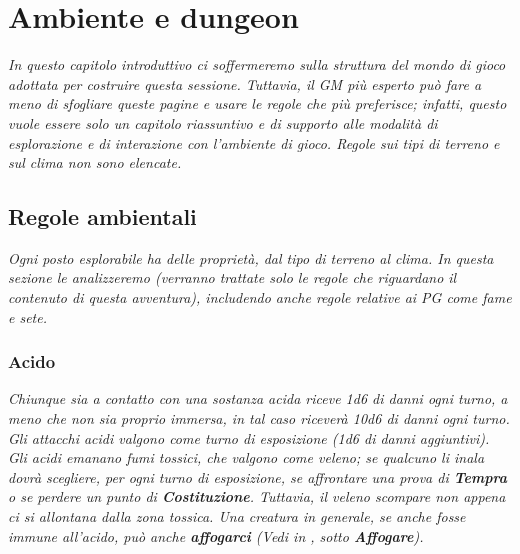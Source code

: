 \chapter{Ambiente e dungeon}
	\emph{In questo capitolo introduttivo ci soffermeremo sulla struttura del mondo di gioco adottata per costruire questa sessione. Tuttavia, il GM più esperto può fare a meno di sfogliare queste pagine e usare le regole che più preferisce; infatti, questo vuole essere solo un capitolo riassuntivo e di supporto alle modalità di esplorazione e di interazione con l'ambiente di gioco. Regole sui tipi di terreno e sul clima non sono elencate.}\\
	
	\section{Regole ambientali}
	
		\emph{Ogni posto esplorabile ha delle proprietà, dal tipo di terreno al clima. In questa sezione le analizzeremo (verranno trattate solo le regole che riguardano il contenuto di questa avventura), includendo anche regole relative ai PG come fame e sete.}	
		
		\subsection{Acido}
			\emph{Chiunque sia a contatto con una sostanza acida riceve \textit{1d6} di danni ogni turno, a meno che non sia proprio immersa, in tal caso riceverà \textit{10d6} di danni ogni turno. Gli attacchi acidi valgono come turno di esposizione (\textit{1d6} di danni aggiuntivi).\\
			Gli acidi emanano fumi tossici, che valgono come veleno; se qualcuno li inala dovrà scegliere, per ogni turno di esposizione, se affrontare una prova di \textbf{Tempra} o se perdere un punto di \textbf{ Costituzione}. Tuttavia, il veleno scompare non appena ci si allontana dalla zona tossica. Una creatura in generale, se anche fosse immune all'acido, può anche \textbf{affogarci} (Vedi in \textbf{}, sotto \textbf{Affogare}).}	
		
